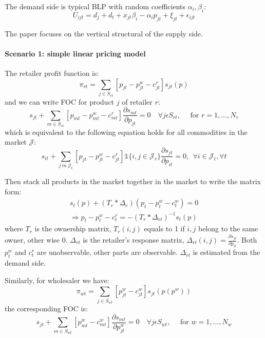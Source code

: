 The demand side is typical BLP with random coefficients $\alpha_i, \beta_i$:
\[
    U_{i j t}=d_{j}+d_{t}+x_{j t} \beta_{i}-\alpha_{i} p_{j t}+\xi_{j t}+\epsilon_{i j t} \tag{1}
\]

The paper focuses on the vertical structural of the supply side.

\paragraph{Scenario 1: simple linear pricing model}

The retailer profit function is:
\[
    \pi_{r t}=\sum_{j \in S_{r t}}\left[p_{j t}-p_{j t}^{w}-c_{j t}^{r}\right] s_{j t}(p)
\]
and we can write FOC for product $j$ of retailer $r$:
\[
    s_{j t}+\sum_{m \in S_{r t}}\left[p_{m t}-p_{m t}^{w}-c_{m t}^{r}\right] \frac{\partial s_{m t}}{\partial p_{j t}}=0 \quad \forall j \epsilon S_{r t}, \quad \text { for } r=1, \ldots, N_{r}
    \tag{5}
\]
which is equivalent to the following equation holds for all commodities in the market $\mathcal J$:
\[
    s_{it} + \sum_{j \ in \  \mathcal J_t} [p_{jt} - p^w_{jt} - c^r_{jt}] \mathds 1\{i,j \in \mathcal J_r\} \frac{\partial s_{jt}}{ \partial p_{it}} = 0,\ \  \forall i \in \mathcal J_t, \forall t
\]

Then stack all products in the market together in the market to write the matrix form:
\begin{align*}
    s_t(p) + (T_r * \Delta_r)(p_t-p_t^w-c_t^w) = 0 \\
    \Rightarrow
    p_{t}-p_{t}^{w}-c_{t}^{r}=-\left(T_{r} * \Delta_{r t}\right)^{-1} s_{t}(p)
    \tag{6}
\end{align*}
where $T_r$ is the ownership matrix, $T_r(i,j)$ equals to 1 if $i,j$ belong to the same owner, other wise 0. 
$\Delta_{rt}$ is the retailer's response matrix, $\Delta_{rt}(i,j)= \frac{\partial s_{jt}}{\partial p_{it}}$.
Both $p^w_t$ and $c^r_t$ are unobservable, other parts are observable. 
$\Delta_{rt}$ is estimated from the demand side.

Similarly, for wholesaler we have:
\[
    \pi_{w t}=\sum_{j \in S_{w t}}\left[p_{j t}^{w}-c_{j t}^{w}\right] s_{j t}\left(p\left(p^{w}\right)\right)
\]
the corresponding FOC is:
\[
    s_{j t}+\sum_{m \in S_{w t}}\left[p_{m t}^{w}-c_{m t}^{w}\right] \frac{\partial s_{m t}}{\partial p_{j t}^{w}}=0 \quad \forall j \epsilon S_{w t}, \quad \text { for } w=1, \ldots, N_{w}
\]

